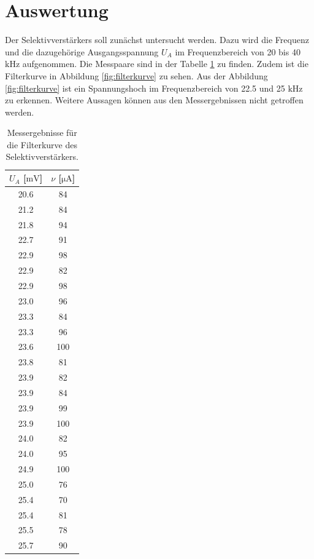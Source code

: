 \section{Auswertung}
\label{sec:Auswertung}
Der Selektivverstärkers soll zunächst untersucht werden.
Dazu wird die Frequenz und die dazugehörige Ausgangsspannung $U_A$ im Frequenzbereich von 20 bis 40 $\si{\kilo\hertz}$ aufgenommen.
Die Messpaare sind in der Tabelle \ref{tab:Messergebnisse} zu finden.
Zudem ist die Filterkurve in Abbildung \ref{fig:filterkurve} zu sehen.
Aus der Abbildung \ref{fig:filterkurve} ist ein Spannungshoch im Frequenzbereich von 22.5 und 25 $\si{\kilo\hertz}$ zu erkennen.
Weitere Aussagen können aus den Messergebnissen nicht getroffen werden.

\begin{table}
  \centering
  \caption{Messergebnisse für die Filterkurve des Selektivverstärkers.}
  \label{tab:Messergebnisse}
  \begin{tabular}{c c}
    \toprule
    {$U_A$ [$\si{\milli\volt}$]} & {$\nu$ [$\si{\micro\ampere}$]}\\
    \midrule
      20.6   & 84 \\
      21.2   & 84 \\
      21.8   & 94 \\
      22.7   & 91 \\
      22.9   & 98 \\
      22.9   & 82 \\
      22.9   & 98 \\
      23.0   & 96 \\
      23.3   & 84 \\
      23.3   & 96 \\
      23.6   & 100 \\
      23.8   & 81 \\
      23.9   & 82 \\
      23.9   & 84 \\
      23.9   & 99 \\
      23.9   & 100 \\
      24.0   & 82 \\
      24.0   & 95 \\
      24.9   & 100 \\
      25.0   & 76 \\
      25.4   & 70 \\
      25.4   & 81 \\
      25.5   & 78 \\
      25.7   & 90 \\

\end{tabular}
\end{table}
